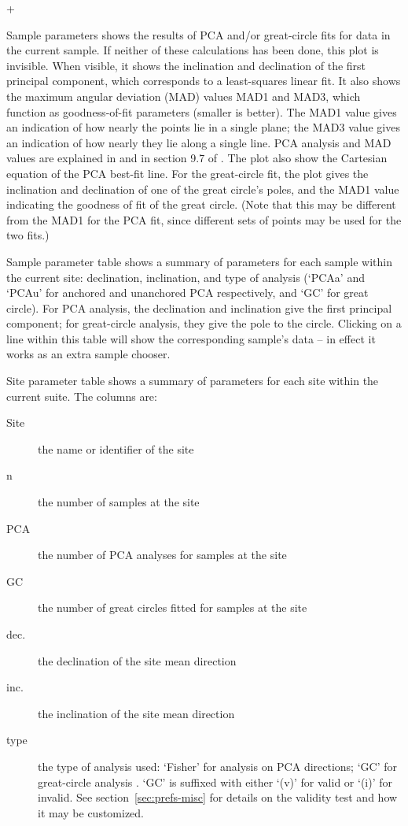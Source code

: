 \documentclass[a4paper,british]{article}
\newcommand{\menuitemlabel}[1]{%
\mbox{\textsf{#1}}\hfil}
\newenvironment{menuitemlist}%
{\begin{list}{}{%
\renewcommand{\makelabel}{\menuitemlabel}%
\setlength{\labelwidth}{35pt}%
\setlength{\leftmargin}%
             {\labelwidth+\labelsep}}}%
{\end{list}}
\newcommand{\caps}[1]{\MakeTextUppercase{#1}} %
\begin{document}
\begin{menuitemlist}
\item[Sample parameters] shows the results of \caps{pca} and/or great-circle
  fits for data in the current sample. If neither of these calculations has
  been done, this plot is invisible. When visible, it shows the inclination
  and declination of the first principal component, which corresponds to a
  least-squares linear fit. It also shows the maximum angular deviation
  (\caps{mad}) values \caps{mad}1 and \caps{mad}3, which function as
  goodness-of-fit parameters (smaller is better). The \caps{mad}1 value gives
  an indication of how nearly the points lie in a single plane; the
  \caps{mad}3 value gives an indication of how nearly they lie along a single
  line. \caps{Pca} analysis and \caps{mad} values are explained in
  \cite{kirschvink1980least} and in section 9.7 of
  \cite{tauxe2010paleomagnetism}. The plot also show the Cartesian equation
  of the \caps{pca} best-fit line. For the great-circle fit, the plot gives the
  inclination and declination of one of the great circle's poles, and the
  \caps{mad}1 value indicating the goodness of fit of the great circle. (Note
  that this may be different from the \caps{mad}1 for the \caps{pca} fit,
  since different sets of points may be used for the two fits.)

\item[Sample parameter table] shows a summary of parameters for each sample
  within the current site: declination, inclination, and type of analysis
  (`\caps{pca}a' and `\caps{pca}u' for anchored and unanchored \caps{pca} respectively, and `GC'
  for great circle). For \caps{pca} analysis, the declination and inclination
  give the first principal component; for great-circle analysis, they
  give the pole to the circle. Clicking on a line within this table
  will show the corresponding sample's data -- in effect it works
  as an extra sample chooser.

\item[Site parameter table] shows a summary of parameters for each site
  within the current suite. The columns are:

  \begin{description}
  \item[Site] the name or identifier of the site
  \item[n] the number of samples at the site
  \item[\caps{pca}] the number of \caps{pca} analyses for samples at the site
  \item[GC] the number of great circles fitted for samples at the site
  \item[dec.] the declination of the site mean direction
  \item[inc.] the inclination of the site mean direction
  \item[type] the type of analysis used: `Fisher' for \cite{fisher1953sphere}
    analysis on \caps{pca} directions; `GC' for great-circle analysis
    \citep{mcfadden1988circles}. `GC' is suffixed with either `(v)' for valid
    or `(i)' for invalid. See section~\ref{sec:prefs-misc} for details on the
    validity test and how it may be customized.
  \end{description}


\end{menuitemlist}
\end{document}
